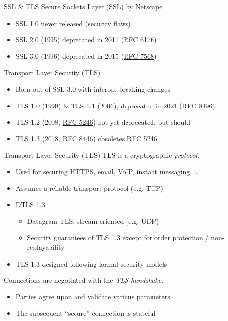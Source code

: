 \begin{frame}{SSL \& TLS}
  Secure Sockets Layer (SSL) by Netscape
  \begin{itemize}[<+(1)->]
    \item SSL 1.0 never released (security flaws)
    \item SSL 2.0 (1995) deprecated in 2011 (\href{https://datatracker.ietf.org/doc/html/rfc6176}{RFC 6176})
    \item SSL 3.0 (1996) deprecated in 2015 (\href{https://datatracker.ietf.org/doc/html/rfc7568}{RFC 7568}) 
  \end{itemize}

  \vspace*{1em}

  \pause
  Transport Layer Security (TLS)
  \begin{itemize}[<+(1)->]
    \item Born out of SSL 3.0 with interop.-breaking changes
    \item TLS 1.0 (1999) \& TLS 1.1 (2006), deprecated in 2021 (\href{https://datatracker.ietf.org/doc/html/rfc8996}{RFC 8996})
    \item TLS 1.2 (2008, \href{https://datatracker.ietf.org/doc/html/rfc5246}{RFC 5246}) not yet deprecated, but should
    \item TLS 1.3 (2018, \href{https://datatracker.ietf.org/doc/html/rfc8446}{RFC 8446}) obsoletes RFC 5246
  \end{itemize}
\end{frame}

\begin{frame}{Transport Layer Security (TLS)}
  TLS is a cryptographic \emph{protocol}.
  \begin{itemize}[<+(1)->]
    \item Used for securing HTTPS, email, VoIP, instant messaging, \dots
    \item Assumes a reliable transport protocol (e.g. TCP)
    \item DTLS 1.3
    \begin{itemize}
      \item Datagram TLS: stream-oriented (e.g. UDP)
      \item Security guarantees of TLS 1.3  except for order protection / non-replayability
    \end{itemize}
    \item TLS 1.3 designed following formal security models
  \end{itemize}

  \vspace*{1em}

  \pause
  Connections are negotiated with the \emph{TLS handshake}.
  \begin{itemize}[<+(1)->]
    \item Parties agree upon and validate various parameters
    \item The subsequent \enquote{secure} connection is stateful
  \end{itemize}
\end{frame}

